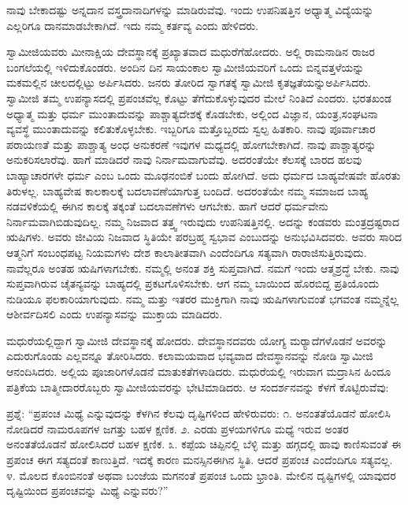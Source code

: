  ನಾವು ಬೇಕಾದಷ್ಟು ಅನ್ನದಾನ ವಸ್ತ್ರದಾನಾದಿಗಳನ್ನು ಮಾಡಿರುವೆವು. ಇಂದು ಉಪನಿಷತ್ತಿನ ಅಧ್ಯಾತ್ಮ ವಿದ್ಯೆಯನ್ನು ಎಲ್ಲರಿಗೂ ದಾನಮಾಡಬೇಕಾಗಿದೆ. ಇದು ನಮ್ಮ ಕರ್ತವ್ಯ ಎಂದು ಹೇಳಿದರು. 

 ಸ್ವಾಮೀಜಿಯವರು ಮೀನಾಕ್ಷಿಯ ದೇವಸ್ಥಾನಕ್ಕೆ ಪ್ರಖ್ಯಾತವಾದ ಮಧುರೆಗೆ\break ಹೋದರು. ಅಲ್ಲಿ ರಾಮನಾಡಿನ ರಾಜರ ಬಂಗಲೆಯಲ್ಲಿ ಇಳಿದುಕೊಂಡರು. ಅಂದಿನ ದಿನ ಸಾಯಂಕಾಲ ಸ್ವಾಮೀಜಿಯವರಿಗೆ ಒಂದು ಬಿನ್ನವತ್ತಳೆಯನ್ನು ಮಕಮಲ್ಲಿನ ಚೀಲದಲ್ಲಿಟ್ಟು ಅರ್ಪಿಸಿದರು. ಜನರು ತೋರಿದ ಸ್ವಾಗತಕ್ಕೆ ಸ್ವಾಮೀಜಿ ಕೃತಜ್ಞತೆಯನ್ನು\break ಅರ್ಪಿಸಿದರು. ಸ್ವಾಮೀಜಿ ತಮ್ಮ ಉಪನ್ಯಾಸದಲ್ಲಿ ಪ್ರಪಂಚವೆಲ್ಲ ಕೊಟ್ಟು ತೆಗೆದುಕೊಳ್ಳುವುದರ ಮೇಲೆ ನಿಂತಿದೆ ಎಂದರು. ಭರತಖಂಡ ಅಧ್ಯಾತ್ಮ ಮತ್ತು ಧರ್ಮ ಮುಂತಾದುವನ್ನು ಪಾಶ್ಚಾತ್ಯದೇಶಕ್ಕೆ ಕೊಡಬೇಕು, ಅಲ್ಲಿಂದ ವಿಜ್ಞಾನ, ಯಂತ್ರ,\break ಸಂಘಟನಾ ವ್ಯವಸ್ಥೆ ಮುಂತಾದುವನ್ನು ಕಲಿತುಕೊಳ್ಳಬೇಕು. ಇಬ್ಬರಿಗೂ ಮತ್ತೊಬ್ಬರದು ಸ್ವಲ್ಪ ಹಿತಕಾರಿ. ನಾವು ಪೂರ್ವಾಚಾರ ಪರಾಯಣತೆ ಮತ್ತು ಪಾಶ್ಚಾತ್ಯ ಅಂಧ ಅನುಕರಣೆ ಇವುಗಳ ಮಧ್ಯದಲ್ಲಿ ಹೋಗಬೇಕಾಗಿದೆ. ನಾವು ಪಾಶ್ಚಾತ್ಯರನ್ನು ಅನುಕರಿಸಲಾರೆವು. ಹಾಗೆ ಮಾಡಿದರೆ ನಾವು ನಿರ್ನಾಮವಾಗುವೆವು. ಅದರಂತೆಯೇ ಕೆಲಸಕ್ಕೆ ಬಾರದ ಹಲವು ಬಾಹ್ಯಾಚಾರಗಳೇ ಧರ್ಮ ಎಂಬ ಒಂದು ಮೂಢನಂಬಿಕೆ ಬಂದು ಹೋಗಿದೆ. ಅದು ಧರ್ಮದ ಬಾಹ್ಯವೇಷವೇ ಹೊರತು ತಿರುಳಲ್ಲ. ಬಾಹ್ಯವೇಷ ಕಾಲಕಾಲಕ್ಕೆ ಬದಲಾವಣೆಯಾಗುತ್ತ ಬಂದಿದೆ. ಅದರಂತೆಯೇ ನಮ್ಮ ಸಮಾಜದ ಬಾಹ್ಯ ನಡವಳಿಕೆಯಲ್ಲಿ ಈಗಿನ ಕಾಲಕ್ಕೆ ತಕ್ಕಂತೆ ಬದಲಾವಣೆಗಳು ಆಗಬೇಕು. ಹಾಗೆ ಆದರೆ ಧರ್ಮವೇನು ನಿರ್ನಾಮವಾಗಿಬಿಡುವುದಿಲ್ಲ. ನಮ್ಮ ನಿಜವಾದ ತತ್ತ್ವ ಇರುವುದು ಉಪನಿಷತ್ತಿನಲ್ಲಿ. ಅದನ್ನು ಕಂಡವರು ಮಂತ್ರದ್ರಷ್ಟರಾದ ಋಷಿಗಳು. ಅವರು ಜೀವಿಯ ನಿಜವಾದ ಸ್ಥಿತಿಯೇ ಪರಬ್ರಹ್ಮ ಸ್ವಭಾವ ಎಂಬುದನ್ನು ಅನುಭವಿಸಿದವರು. ಅವರು ಸಾರಿದ ಆತ್ಮನಿಗೆ ಸಂಬಂಧಪಟ್ಟ ನಿಯಮಗಳು ದೇಶ ಕಾಲಾತೀತವಾಗಿ ಎಂದೆಂದಿಗೂ ಸತ್ಯವಾಗಿ ರಾರಾಜಿಸುತ್ತಿರುವುದು. ನಾವೆಲ್ಲರೂ ಅಂತಹ ಋಷಿಗಳಾಗಬೇಕು. ನಮ್ಮಲ್ಲಿ ಅನಂತ ಶಕ್ತಿ ಸುಪ್ತವಾಗಿದೆ. ನಮಗೆ ಇಂದು ಆತ್ಮಶ್ರದ್ಧೆ ಬೇಕು. ನಾವು ಸುಪ್ತವಾಗಿರುವ ಚೈತನ್ಯವನ್ನು ಬಾಹ್ಯದಲ್ಲಿ ಪ್ರಕಟಗೊಳಿಸಬೇಕು. ಆಗ ನಮ್ಮ ಬಾಯಿಂದ ಹೊರಬಿದ್ದ ಪ್ರತಿಯೊಂದು ನುಡಿಯೂ ಫಲಕಾರಿಯಾಗುವುದು. ನಮ್ಮ ಮತ್ತು ಇತರರ ಮುಕ್ತಿಗಾಗಿ ನಾವು ಋಷಿಗಳಾಗುವಂತೆ ಭಗವಂತ ನಮ್ಮನ್ನೆಲ್ಲ ಆಶೀರ್ವದಿಸಲಿ ಎಂದು ಉಪನ್ಯಾಸವನ್ನು ಮುಕ್ತಾಯ ಮಾಡಿದರು. 

 ಮಧುರೆಯಲ್ಲಿದ್ದಾಗ ಸ್ವಾಮೀಜಿ ದೇವಸ್ಥಾನಕ್ಕೆ ಹೋದರು. ದೇವಸ್ಥಾನದವರು ಯೋಗ್ಯ ಮರ‍್ಯಾದೆಗಳೊಡನೆ ಅವರನ್ನು ಎದುರುಗೊಂಡು ಎಲ್ಲವನ್ನೂ ತೋರಿಸಿದರು. ಕಲಾಮಯವಾದ ಭವ್ಯವಾದ ದೇವಸ್ಥಾನವನ್ನು ನೋಡಿ ಸ್ವಾಮೀಜಿ ಆನಂದಿಸಿದರು. ಅಲ್ಲಿಯ ಪೂಜಾರಿಗಳೊಡನೆ ಮಾತುಕತೆಗಳಾಡಿದರು. ಮಧುರೆಯಲ್ಲಿ ಇರುವಾಗ ಮದ್ರಾಸಿನ ಹಿಂದೂ ಪತ್ರಿಕೆಯ ಬಾತ್ಮೀದಾರರೊಬ್ಬರು ಸ್ವಾಮೀಜಿಯವರನ್ನು ಭೇಟಿಮಾಡಿದರು. ಆ ಸಂದರ್ಶನವನ್ನು ಕೆಳಗೆ ಕೊಟ್ಟಿರುವೆವು: 

 ಪ್ರಶ್ನೆ: “ಪ್ರಪಂಚ ಮಿಥ್ಯೆ ಎನ್ನುವುದನ್ನು ಕೆಳಗಿನ ಕೆಲವು ದೃಷ್ಟಿಗಳಿಂದ ಹೇಳಿರುವರು: ೧. ಅನಂತತೆಯೊಡನೆ ಹೋಲಿಸಿ ನೋಡಿದರೆ ನಾಮರೂಪಗಳ ಜಗತ್ತು ಬಹಳ ಕ್ಷಣಿಕ. ೨. ಎರಡು ಪ್ರಳಯಗಳಿಗೂ ಮಧ್ಯೆ ಇರುವ ಅಂತರ ಅನಂತತೆಯೊಡನೆ ಹೋಲಿಸಿದರೆ ಬಹಳ ಕ್ಷಣಿಕ. ೩. ಕಪ್ಪೆಯ ಚಿಪ್ಪಿನಲ್ಲಿ ಬೆಳ್ಳಿ ಮತ್ತು ಹಗ್ಗದಲ್ಲಿ ಹಾವು ಕಾಣಿಸುವಂತೆ ಈ ಪ್ರಪಂಚ ಈಗ ಸತ್ಯದಂತೆ ಕಾಣುತ್ತಿದೆ. ಇದಕ್ಕೆ ಕಾರಣ ಮನಸ್ಸಿನ\break ಈಗಿನ ಸ್ಥಿತಿ. ಆದರೆ ಪ್ರಪಂಚ ಎಂದೆಂದಿಗೂ ಸತ್ಯವಲ್ಲ. ೪. ಮೊಲದ ಕೊಂಬಿನಂತೆ ಅಥವಾ ಬಂಜೆಯ ಮಗನಂತೆ ಪ್ರಪಂಚ ಒಂದು ಭ್ರಾಂತಿ. ಮೇಲಿನ ದೃಷ್ಟಿಗಳಲ್ಲಿ ಯಾವುದರ ದೃಷ್ಟಿಯಿಂದ ಪ್ರಪಂಚವನ್ನು ಮಿಥ್ಯೆ ಎನ್ನುವರು?” 

